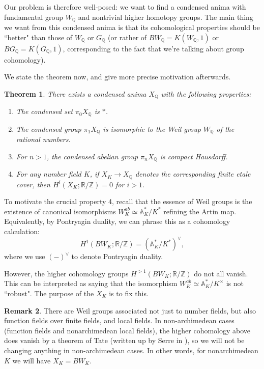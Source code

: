 \documentclass[12pt]{article}
\newtheorem{theorem}{Theorem}[section]
\theoremstyle{definition}
\newtheorem{remark}[theorem]{Remark}
\newcommand{\mbb}{\mathbb}
\begin{document}
Our problem is therefore well-posed: we want to find a condensed anima with fundamental group $W_{\mbb{Q}}$ and nontrivial higher homotopy groups.  The main thing we want from this condensed anima is that its cohomological properties should be ``better" than those of $W_{\mbb{Q}}$ or $G_{\mbb{Q}}$ (or rather of $BW_{\mbb{Q}}=K(W_\mbb{Q},1)$ or $BG_{\mbb{Q}}=K(G_\mbb{Q},1)$, corresponding to the fact that we're talking about group cohomology).

We state the theorem now, and give more precise motivation afterwards.
 
\begin{theorem}
There exists a condensed anima $X_{\mbb{Q}}$ with the following properties:
\begin{enumerate}
\item The condensed set $\pi_0 X_{\mbb{Q}}$ is $\ast$.
\item The condensed group $\pi_1 X_{\mbb{Q}}$ is isomorphic to the Weil group $W_\mbb{Q}$ of the rational numbers.
\item For $n>1$, the condensed abelian group $\pi_n X_{\mbb{Q}}$ is compact Hausdorff.
\item For any number field $K$, if $X_K \to X_{\mbb{Q}}$ denotes the corresponding finite etale cover, then $H^i(X_K;\mbb{R}/\mbb{Z})=0$ for $i>1$.
\end{enumerate}
\end{theorem}

To motivate the crucial property 4, recall that the essence of Weil groups is the existence of canonical isomorphisms $W_K^{ab}\simeq \mbb{A}_K^\ast/K^\ast$ refining the Artin map.  Equivalently, by Pontryagin duality, we can phrase this as a cohomology calculation:
$$H^1(BW_K;\mbb{R}/\mbb{Z})= (\mbb{A}_K^\ast/K^\ast)^{\vee},$$
where we use $(-)^\vee$ to denote Pontryagin duality.

However, the higher cohomology groups $H^{>1}(BW_K;\mbb{R}/\mbb{Z})$ do not all vanish.  This can be interpreted as saying that the isomorphism $W_K^{ab}\simeq \mathbb{A}_K^\ast/K^\times$ is not ``robust".  The purpose of the $X_K$ is to fix this.

\begin{remark}
   There are Weil groups associated not just to number fields, but also function fields over finite fields, and local fields.  In non-archimedean cases (function fields and nonarchimedean local fields), the higher cohomology above does vanish by a theorem of Tate (written up by Serre in \cite{serrewt1}), so we will not be changing anything in non-archimedean cases.  In other words, for nonarchimedean $K$ we will have $X_K=BW_K$.
\end{remark}
\end{document}
